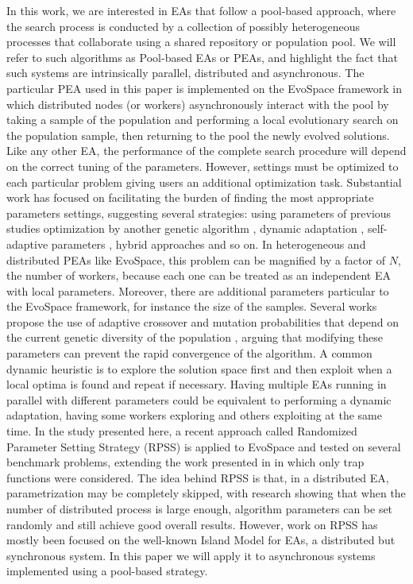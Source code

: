 \documentclass[conference]{IEEEtran}
\begin{document}
In this work, we are interested in EAs that follow a
pool-based approach, where the search process is conducted by a
collection of possibly heterogeneous processes that collaborate using
a shared repository or population pool. We will refer to such
algorithms as Pool-based EAs or PEAs, and highlight the fact that such
systems are intrinsically parallel, distributed and asynchronous.
The particular PEA used in this paper is implemented on
the EvoSpace framework \cite{GValdez2015}
in which distributed nodes (or workers) asynchronously interact
with the pool by taking a sample of the population and performing
a local evolutionary search on the population sample, then returning
to the pool the newly evolved solutions.
Like any other EA, the performance of the complete search procedure will depend
on the correct tuning of the parameters. However, settings
must be optimized to each particular problem \cite{de2007parameter}
giving users an additional optimization task.
Substantial work has focused on facilitating the burden of finding
the most appropriate parameters settings, suggesting several strategies:
using parameters of previous studies \cite{eiben1999parameter}
optimization by another genetic algorithm \cite{grefenstette1986optimization},
dynamic adaptation \cite{eiben1999parameter},
self-adaptive parameters \cite{pellerin2004self}, hybrid approaches \cite{de2007parameter} and so on.
In heterogeneous and distributed PEAs like EvoSpace, this problem can
be magnified by a factor of $N$, the number of workers, because each one
can be treated as an independent EA with local parameters. Moreover, there
are additional parameters particular to the EvoSpace framework,
for instance the size of the samples.
Several works propose the use of adaptive crossover and mutation probabilities
that depend on the current genetic diversity of the population \cite{pellerin2004self},
arguing that modifying these parameters can prevent the rapid convergence of the
algorithm.
A common dynamic heuristic is to explore the solution space first and then exploit
when a local optima is found and repeat if necessary.
Having multiple EAs running in parallel with different parameters could be
equivalent to performing a dynamic adaptation, having some workers exploring
and others exploiting at the same time.
In the study presented here, a recent approach called Randomized Parameter
Setting Strategy (RPSS) \cite{fuku1,fuku2} is applied to EvoSpace and tested on
several benchmark problems, extending the work presented in \cite{garcia2014randomized}
in which only trap functions were considered.
The idea behind RPSS is that, in a distributed EA, parametrization may be
completely skipped, with research showing that when the
number of distributed process is large enough, algorithm parameters can be set
randomly and still achieve good overall results. However, work on RPSS has
mostly been focused on the well-known Island Model for EAs, a distributed but synchronous system. In this paper we will apply it to asynchronous systems implemented using a pool-based strategy.
\end{document}
